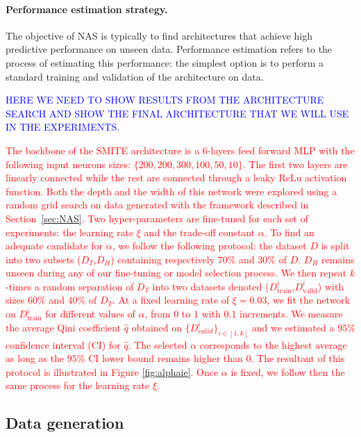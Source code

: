 \documentclass{article}
\begin{document}
\paragraph{Performance estimation strategy.}

The objective of NAS is typically to find architectures that achieve high predictive performance on unseen data. Performance
estimation refers to the process of estimating this performance: the simplest option is to perform a standard training and validation of the architecture on data.


\textcolor{blue}{HERE WE NEED TO SHOW RESULTS FROM THE ARCHITECTURE SEARCH AND SHOW THE FINAL ARCHITECTURE THAT WE WILL USE IN THE EXPERIMENTS.}

\textcolor{red}{The backbone of the SMITE architecture is a $6$-layers feed forward MLP with the following input neurons sizes: $\{200,200,300,100,50,10\}$. The first two layers are linearly connected while the rest are connected through a leaky ReLu activation function. Both the depth and the width of this network were explored using a random grid search on data generated with the framework described in Section~\ref{sec:NAS}. Two hyper-parameters are fine-tuned for each set of experiments: the learning rate $\xi$ and the trade-off constant $\alpha$. To find an adequate candidate for $\alpha$, we follow the following protocol: the dataset $D$ is split into two subsets ($D_T$,$D_H$) containing respectively $70\%$ and $30\%$ of $D$. $D_H$ remains unseen during any of our fine-tuning or model selection process. We then repeat $k$-times a random separation of $D_T$ into two datasets denoted ($D^{i}_{\mathrm{train}}$,$D^{i}_{\mathrm{valid}}$) with sizes $60\%$ and $40\%$ of $D_T$. At a fixed learning rate of $\xi=0.03$, we fit the network on $D^{i}_{\mathrm{train}}$ for different values of $\alpha$, from $0$ to $1$ with $0.1$ increments. We measure the average Qini coefficient $\hat q$ obtained on $\{D^{i}_{valid}\}_{i \in [1,k]}$ and we estimated a $95\%$ confidence interval (CI) for $\hat q$. The selected $\alpha$ corresponds to the highest average as long as the $95\%$ CI lower bound remains higher than $0$. The resultant of this protocol is illustrated in Figure \ref{fig:alphaie}. Once $\alpha$ is fixed, we follow then the same process for the learning rate $\xi$.}




\subsection{Data generation}
\end{document}
